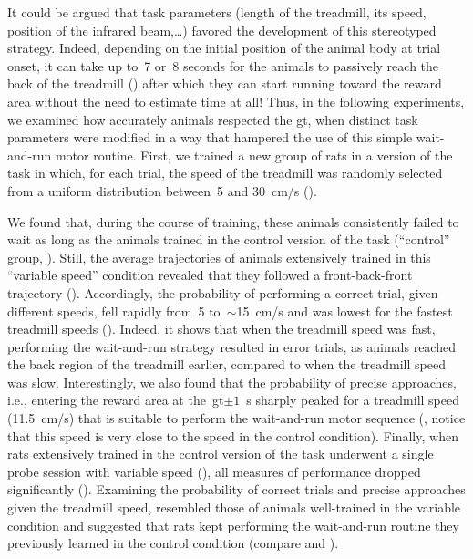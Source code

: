 It could be argued that task parameters (length of the treadmill, its speed, position of the infrared beam,\dots) favored the development of this stereotyped strategy.
Indeed, depending on the initial position of the animal body at trial onset, it can take up to~7 or~8 seconds for the animals to passively reach the back of the treadmill () after which they can start running toward the reward area without the need to estimate time at all!
Thus, in the following experiments, we examined how accurately animals respected the \gls{gt}, when distinct task parameters were modified in a way that hampered the use of this simple wait-and-run motor routine.
First, we trained a new group of rats in a version of the task in which, for each trial, the speed of the treadmill was randomly selected from a uniform distribution between~5 and 30~cm/s ().

We found that, during the course of training, these animals consistently failed to wait as long as the animals trained in the control version of the task (``control'' group, ).
Still, the average trajectories of animals extensively trained in this ``variable speed'' condition revealed that they followed a front-back-front trajectory ().
Accordingly, the probability of performing a correct trial, given different speeds, fell rapidly from~5 to~$\sim$15~cm/s and was lowest for the fastest treadmill speeds ().
Indeed, it shows that when the treadmill speed was fast, performing the wait-and-run strategy resulted in error trials, as animals reached the back region of the treadmill earlier, compared to when the treadmill speed was slow.
Interestingly, we also found that the probability of precise approaches, i.e., entering the reward area at the~\gls{gt}$\pm 1$~s sharply peaked for a treadmill speed (11.5~cm/s) that is suitable to perform the wait-and-run motor sequence (, notice that this speed is very close to the speed in the control condition).
Finally, when rats extensively trained in the control version of the task underwent a single probe session with variable speed (), all measures of performance dropped significantly ().
Examining the probability of correct trials and precise approaches given the treadmill speed, resembled those of animals well-trained in the variable condition and suggested that rats kept performing the wait-and-run routine they previously learned in the control condition (compare  and ).


